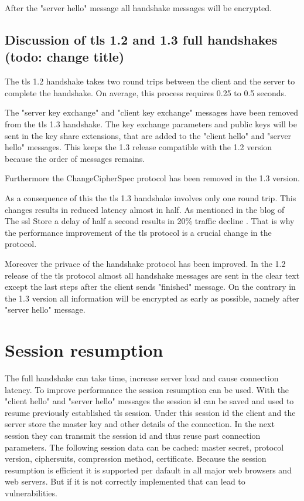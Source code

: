 After the "server hello" message all handshake messages will be encrypted.

\subsection{Discussion of \gls{tls} 1.2 and 1.3 full handshakes (todo: change title)}
\label{subsec:comparison_handshake}

The \gls{tls} 1.2 handshake takes two round trips between the client and the server to complete the handshake. On average, this process requires 0.25 to 0.5 seconds.

The "server key exchange" and "client key exchange" messages have been removed from the \gls{tls} 1.3 handshake. The key exchange parameters and public keys will be sent in the key share extensions, that are added to the "client hello" and "server hello" messages. This keeps the 1.3 release compatible with the 1.2 version because the order of messages remains.

Furthermore the ChangeCipherSpec protocol has been removed in the 1.3 version. 

As a consequence of this the \gls{tls} 1.3 handshake involves only one round trip. This changes results in reduced latency almost in half. As mentioned in the blog of The \gls{ssl} Store a delay of half a second results in 20\% traffic decline \cite{sslstore:handshake}. That is why the performance improvement of the \gls{tls} protocol is a crucial change in the protocol.

Moreover the privace of the handshake protocol has been improved. In the 1.2 release of the \gls{tls} protocol almost all handshake messages are sent in the clear text except the last steps after the client sends "finished" message. On the contrary in the 1.3 version all information will be encrypted as early as possible, namely after "server hello" message. 

\section{Session resumption}
\label{sec:comparison_resumption}

The full handshake can take time, increase server load and cause connection latency. To improve performance the session resumption can be used. With the "client hello" and "server hello" messages the session id can be saved and used to resume previously established \gls{tls} session. Under this session id the client and the server store the master key and other details of the connection. In the next session they can transmit the session id and thus reuse past connection parameters. The following session data can be cached: master secret, protocol version, ciphersuits, compression method, certificate. Because the session resumption is efficient it is supported per dafault in all major web browsers and web servers. But if it is not correctly implemented that can lead to vulnerabilities.

